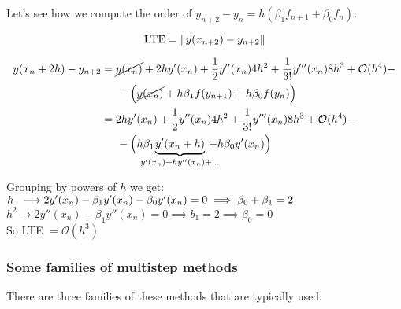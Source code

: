 \begin{example}

Let's see how we compute the order of $y_{n+2}-y_n = h(\beta_1f_{n+1} + \beta_0f_n)$:

\[
  \text{LTE} = \left\lVert y(x_{n+2}) - y_{n+2}\right\rVert
\]

\begin{align*}
    y(x_n + 2h) - y_{n+2} &= \cancel{y(x_n)} + 2hy'(x_n) + \frac{1}{2}y''(x_n)4h^2 + \frac{1}{3!}y'''(x_n)8h^3 + \mathcal{O}(h^4) - \\
    &\hspace{0.5cm}- \Big(\cancel{y(x_n)} + h\beta_1f(y_{n+1}) + h\beta_0f(y_n) \Big) \\
    &= 2hy'(x_n) + \frac{1}{2}y''(x_n)4h^2 + \frac{1}{3!}y'''(x_n)8h^3 + \mathcal{O}(h^4) - \\
    &\hspace{0.5cm}- \Big(h\beta_1\hspace{-0.5cm}\underbrace{y'(x_n + h)}_{y'(x_n) + hy''(x_n) + \ldots}\hspace{-0.4cm} + h\beta_0y'(x_n) \Big) \\
\end{align*}

\newpage

Grouping by powers of $h$ we get:\\

$h \hspace{0.2cm}\longrightarrow 2y'(x_n) - \beta_1y'(x_n) - \beta_0y'(x_n) = 0 \implies \beta_0 + \beta_1 = 2$\\

$h^2 \longrightarrow 2y''(x_n) - \beta_1y''(x_n) = 0 \implies b_1 = 2 \implies \beta_0 = 0$\\

So LTE $= \mathcal{O}(h^3)$\\
\end{example}

\subsubsection{Some families of multistep methods}

There are three families of these methods that are typically used:


